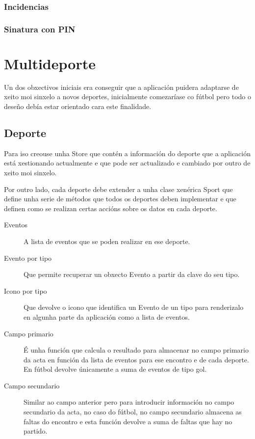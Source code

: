       \subsubsection{Incidencias}

      \subsubsection{Sinatura con PIN}

  \section{Multideporte}
  Un dos obxectivos iniciais era conseguir que a aplicación puidera adaptarse 
de xeito moi sinxelo a novos deportes, inicialmente comezaríase co fútbol pero 
todo o deseño debía estar orientado cara este finalidade.

  \subsection{Deporte}
  Para iso creouse unha Store que contén a información do deporte que a 
aplicación está xestionando actualmente e que pode ser actualizado e cambiado 
por outro de xeito moi sinxelo.

  Por outro lado, cada deporte debe extender a unha clase xenérica Sport que 
define unha serie de métodos que todos os deportes deben implementar e que 
definen como se realizan certas accións sobre os datos en cada deporte.

  \begin{description}
   \item [Eventos] A lista de eventos que se poden realizar en ese deporte.
   \item [Evento por tipo] Que permite recuperar un obxecto Evento a partir da 
clave do seu tipo.
   \item [Icono por tipo] Que devolve o icono que identifica un Evento de un 
tipo para renderizalo en algunha parte da aplicación como a lista de eventos.
   \item [Campo primario] É unha función que calcula o resultado para 
almacenar no campo primario da acta en función da lista de eventos para ese 
encontro e de cada deporte. En fútbol devolve únicamente a suma de eventos de 
tipo gol.
   \item [Campo secundario] Similar ao campo anterior pero para introducir 
información no campo secundario da acta, no caso do fútbol, no campo secundario 
almacena as faltas do encontro e esta función devolve a suma de faltas que hay 
no partido.
  \end{description}

